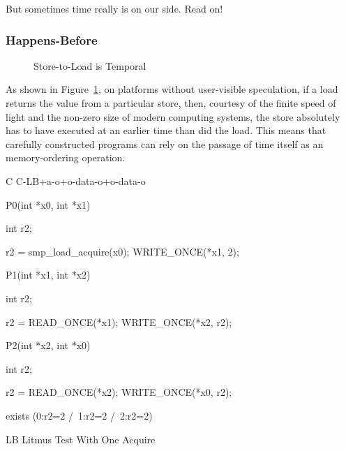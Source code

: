 But sometimes time really is on our side.  Read on!

\subsubsection{Happens-Before}
\label{sec:memorder:Happens-Before}

\begin{figure}[tbp]
\centering
{}
\caption{Store-to-Load is Temporal}
\label{fig:memorder:Store-to-Load is Temporal}
\end{figure}

As shown in
Figure~\ref{fig:memorder:Store-to-Load is Temporal},
on platforms without user-visible speculation, if a load returns the value
from a particular store, then, courtesy of the finite speed of light and
the non-zero size of modern computing systems, the store absolutely has
to have executed at an earlier time than did the load.
This means that carefully constructed programs can rely on the
passage of time itself as an memory-ordering operation.

\begin{listing}[tbp]
{ \scriptsize
\begin{verbbox}[\LstLineNo]
C C-LB+a-o+o-data-o+o-data-o
{
}

P0(int *x0, int *x1)
{
  int r2;

  r2 = smp_load_acquire(x0);
  WRITE_ONCE(*x1, 2);
}


P1(int *x1, int *x2)
{
  int r2;

  r2 = READ_ONCE(*x1);
  WRITE_ONCE(*x2, r2);
}

P2(int *x2, int *x0)
{
  int r2;

  r2 = READ_ONCE(*x2);
  WRITE_ONCE(*x0, r2);
}

exists (0:r2=2 /\ 1:r2=2 /\ 2:r2=2)
\end{verbbox}
}
\centering
\theverbbox
\caption{LB Litmus Test With One Acquire}
\label{lst:memorder:LB Litmus Test With One Acquire}
\end{listing}

